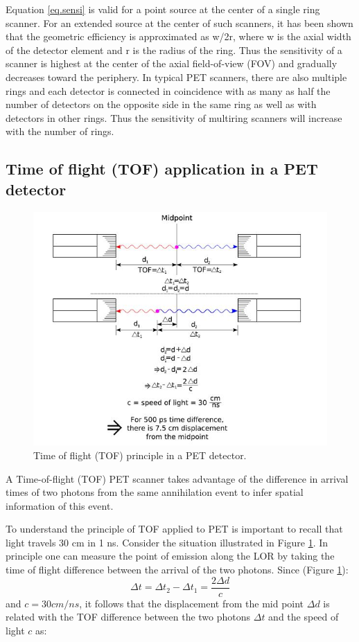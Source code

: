 Equation \ref{eq.sensi} is valid for a point source at the center of a single ring scanner. For an extended source at the center of such scanners, it has been shown that the geometric efficiency is approximated as w/2r, where w is the axial width of the detector element and r is the radius of the ring. Thus the sensitivity of a scanner is highest at the center of the axial field-of-view (FOV) and gradually decreases toward the periphery. In typical PET scanners, there are also multiple rings and each detector is connected in coincidence with as many as half the number of detectors on the opposite side in the same ring as well as with detectors in other rings. Thus the sensitivity of multiring scanners will increase with the number of rings.


\subsection{Time of flight (TOF) application in a PET detector}

\begin{figure}[!bthp]
	\centering
	\includegraphics[scale=1.0]{img/MAPD_tofprinciple.jpg}
	\caption{\label{fig.tof} Time of flight (TOF) principle in a PET detector.}
\end{figure}

A Time-of-flight (TOF) PET scanner takes advantage of the difference in arrival times of two photons from the same annihilation event to infer spatial information of this event. 

To understand the principle of TOF applied to PET is important to recall that light travels 30 cm in 1 ns. Consider the situation illustrated in Figure \ref{fig.tof}. In principle one can measure the point of emission along the LOR by taking the time of flight difference between the arrival of the two photons. Since (Figure \ref{fig.tof}):
\begin{equation}
\Delta t = \Delta t_2 - \Delta t_1 = \frac{2 \Delta d}{c}
\end{equation}
%
and $c = 30 cm/ns$, it follows that the displacement from the mid point
$\Delta d$ is related with the TOF difference between the two photons $\Delta t$ and the speed of light $c$ as:


